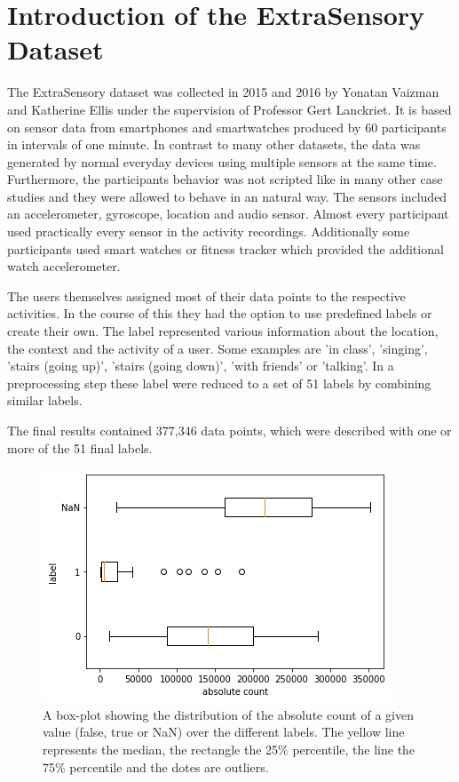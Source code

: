 \section{Introduction of the ExtraSensory Dataset}

The ExtraSensory dataset was collected in 2015 and 2016 by Yonatan Vaizman and Katherine Ellis under the supervision of Professor Gert Lanckriet. It is based on sensor data from smartphones and smartwatches produced by 60 participants in intervals of one minute. In contrast to many other datasets, the data was generated by normal everyday devices using multiple sensors at the same time. Furthermore, the participants behavior was not scripted like in many other case studies and they were allowed to behave in an natural way. The sensors included an accelerometer, gyroscope, location and audio sensor. Almost every participant used practically every sensor in the activity recordings. Additionally some participants used smart watches or fitness tracker which provided the additional watch accelerometer.

The users themselves assigned most of their data points to the respective activities. In the course of this they had the option to use predefined labels or create their own. The label represented various information about the location, the context and the activity of a user. Some examples are 'in class', 'singing', 'stairs (going up)', 'stairs (going down)', 'with friends' or 'talking'. In a preprocessing step these label were reduced to a set of 51 labels by combining similar labels. 

The final results contained 377,346 data points, which were described with one or more of the 51 final labels. 

\begin{figure}[H]
	\begin{center}
		\includegraphics[scale=.8]{images/boxplot_label.png}
		\caption{A box-plot showing the distribution of the absolute count of a given value (false, true or NaN) over the different labels. The yellow line represents the median, the rectangle the 25\% percentile, the line the 75\% percentile and the dotes are outliers.}
		\label{abb:boxplot_label}
	\end{center}		
\end{figure}

